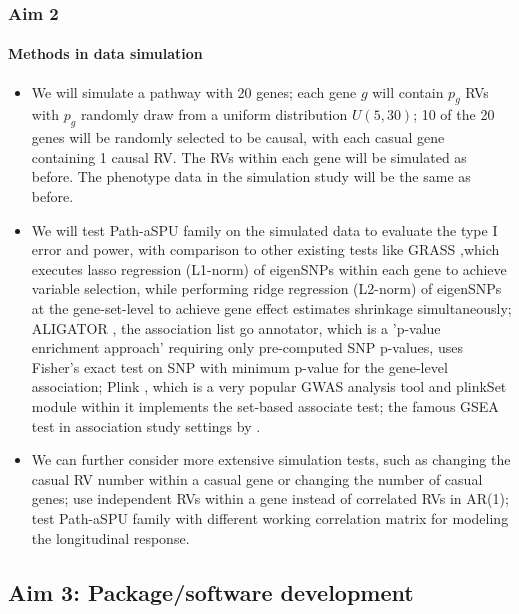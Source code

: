 \documentclass[compress]{beamer}
\begin{document}
\begin{frame}[allowframebreaks]
\frametitle{Aim 2}
\framesubtitle{Methods in data simulation}
\scriptsize
\begin{itemize}


\item We will simulate a pathway with 20 genes; each gene $g$ will contain $p_g$ RVs with $p_g$ randomly draw from a uniform distribution $U(5,30)$; 10 of the 20 genes will be randomly selected to be causal, with each casual gene containing 1 causal RV. The RVs within each gene will be simulated as before. The phenotype data in the simulation study will be the same as before.

\item We will test Path-aSPU family on the simulated data to evaluate the type I error and power, with comparison to other existing tests like GRASS \cite{Chen2010},which executes lasso regression (L1-norm) of eigenSNPs within each gene to achieve variable selection, while performing ridge regression (L2-norm) of eigenSNPs at the gene-set-level to achieve gene effect estimates shrinkage simultaneously; ALIGATOR \cite{Holmans2009}, the association list go annotator, which is a 'p-value enrichment approach' requiring only pre-computed SNP p-values, uses Fisher's exact test on SNP with minimum p-value for the gene-level association; Plink \cite{Purcell2007}, which is a very popular GWAS analysis tool and plinkSet module within it implements the set-based associate test; the famous GSEA test in association study settings by \cite{wang2007pathway}.

\item We can further consider more extensive simulation tests, such as changing the casual RV number within a casual gene or changing the number of casual genes; use independent RVs within a gene instead of correlated RVs in AR(1); test Path-aSPU family with different working correlation matrix for modeling the longitudinal response. 
\end{itemize}
\end{frame}

\subsection{Aim 3: Package/software development}
\end{document}
